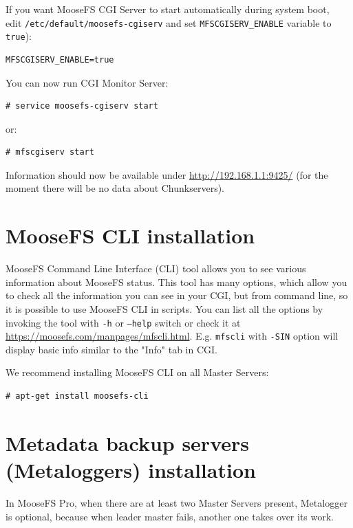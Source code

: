 \documentclass[a4paper,11pt,english]{report}
\def\code#1{\texttt{#1}}
\begin{document}
			If you want MooseFS CGI Server to start automatically during system boot, \\
			edit \code{/etc/default/moosefs-cgiserv} and set \code{MFSCGISERV\_ENABLE} variable to \code{true}):
			
			\begin{lstlisting}[caption={Configuring mfscgiserv autostart}]
	MFSCGISERV_ENABLE=true
			\end{lstlisting}
			
			You can now run CGI Monitor Server:
			
			\begin{lstlisting}[caption={Starting MooseFS CGI Server}]
	# service moosefs-cgiserv start
			\end{lstlisting}
			
			or:
			
			\begin{lstlisting}[caption={Starting MooseFS CGI Server}]
	# mfscgiserv start
			\end{lstlisting}
			
			Information should now be available under \url{http://192.168.1.1:9425/} (for the moment there will be no data about Chunkservers).
			
			
		\section{MooseFS CLI installation}
			MooseFS Command Line Interface (CLI) tool allows you to see various information about MooseFS status. This tool has many options, which allow you to check all the information you can see in your CGI, but from command line, so it is possible to use MooseFS CLI in scripts. You can list all the options by invoking the tool with \code{-h} or \code{--help} switch or check it at \url{https://moosefs.com/manpages/mfscli.html}. E.g. \code{mfscli} with \code{-SIN} option will display basic info similar to the "Info" tab in CGI.
			
			We recommend installing MooseFS CLI on all Master Servers:
			
			\begin{lstlisting}[caption={MooseFS CLI installation}]
	# apt-get install moosefs-cli
			\end{lstlisting}
			
			
		\section{Metadata backup servers (Metaloggers) installation}
			In MooseFS Pro, when there are at least two Master Servers present, Metalogger is optional, because when leader master fails, another one takes over its work.
			
\end{document}

